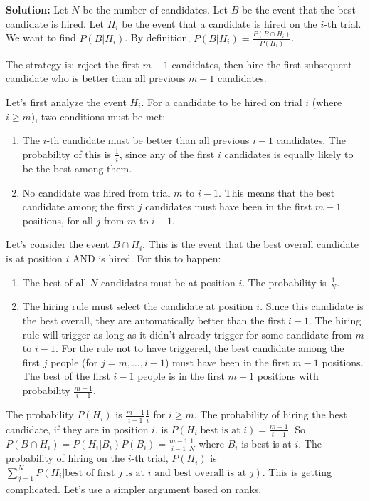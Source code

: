 \noindent\textbf{Solution:}
Let $N$ be the number of candidates. Let $B$ be the event that the best candidate is hired. Let $H_i$ be the event that a candidate is hired on the $i$-th trial. We want to find $P(B|H_i)$.
By definition, $P(B|H_i) = \frac{P(B \cap H_i)}{P(H_i)}$.

The strategy is: reject the first $m-1$ candidates, then hire the first subsequent candidate who is better than all previous $m-1$ candidates.

Let's first analyze the event $H_i$. For a candidate to be hired on trial $i$ (where $i \ge m$), two conditions must be met:
\begin{enumerate}
    \item The $i$-th candidate must be better than all previous $i-1$ candidates. The probability of this is $\frac{1}{i}$, since any of the first $i$ candidates is equally likely to be the best among them.
    \item No candidate was hired from trial $m$ to $i-1$. This means that the best candidate among the first $j$ candidates must have been in the first $m-1$ positions, for all $j$ from $m$ to $i-1$.
\end{enumerate}
Let's consider the event $B \cap H_i$. This is the event that the best overall candidate is at position $i$ AND is hired. For this to happen:
\begin{enumerate}
    \item The best of all $N$ candidates must be at position $i$. The probability is $\frac{1}{N}$.
    \item The hiring rule must select the candidate at position $i$. Since this candidate is the best overall, they are automatically better than the first $i-1$. The hiring rule will trigger as long as it didn't already trigger for some candidate from $m$ to $i-1$. For the rule not to have triggered, the best candidate among the first $j$ people (for $j=m, \dots, i-1$) must have been in the first $m-1$ positions. The best of the first $i-1$ people is in the first $m-1$ positions with probability $\frac{m-1}{i-1}$.
\end{enumerate}
The probability $P(H_i)$ is $\frac{m-1}{i-1}\frac{1}{i}$ for $i\geq m$. The probability of hiring the best candidate, if they are in position $i$, is $P(H_i| \text{best is at } i) = \frac{m-1}{i-1}$.
So $P(B \cap H_i) = P(H_i | B_i)P(B_i) = \frac{m-1}{i-1}\frac{1}{N}$ where $B_i$ is best is at $i$.
The probability of hiring on the $i$-th trial, $P(H_i)$ is $\sum_{j=1}^N P(H_i | \text{best of first } j \text{ is at } i \text{ and best overall is at } j)$.
This is getting complicated. Let's use a simpler argument based on ranks.

